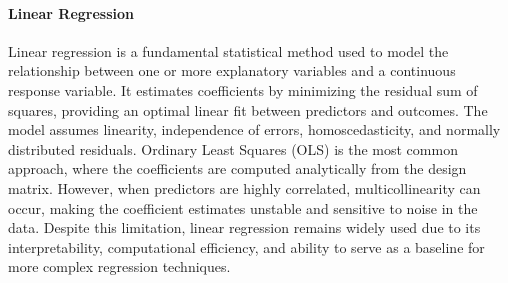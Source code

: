 \paragraph{Linear Regression}
\label{sec:background_ml_lr}
Linear regression is a fundamental statistical method used to model the relationship between one or more explanatory variables and a continuous response variable. It estimates coefficients by minimizing the residual sum of squares, providing an optimal linear fit between predictors and outcomes. The model assumes linearity, independence of errors, homoscedasticity, and normally distributed residuals. Ordinary Least Squares (OLS) is the most common approach, where the coefficients are computed analytically from the design matrix. However, when predictors are highly correlated, multicollinearity can occur, making the coefficient estimates unstable and sensitive to noise in the data. Despite this limitation, linear regression remains widely used due to its interpretability, computational efficiency, and ability to serve as a baseline for more complex regression techniques.



